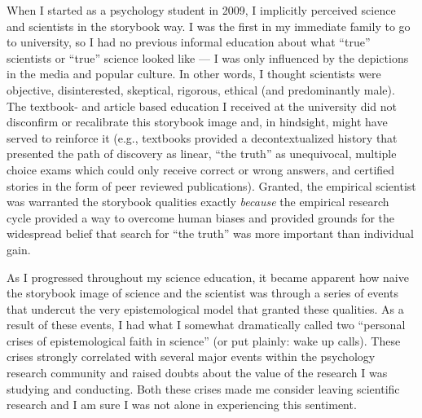 \documentclass[a5paper]{book}
\begin{document}
When I started as a psychology student in 2009, I implicitly perceived
science and scientists in the storybook way. I was the first in my
immediate family to go to university, so I had no previous informal
education about what \enquote{true} scientists or \enquote{true} science
looked like --- I was only influenced by the depictions in the media and
popular culture. In other words, I thought scientists were objective,
disinterested, skeptical, rigorous, ethical (and predominantly male).
The textbook- and article based education I received at the university
did not disconfirm or recalibrate this storybook image and, in
hindsight, might have served to reinforce it (e.g., textbooks provided a
decontextualized history that presented the path of discovery as linear,
\enquote{the truth} as unequivocal, multiple choice exams which could
only receive correct or wrong answers, and certified stories in the form
of peer reviewed publications). Granted, the empirical scientist was
warranted the storybook qualities exactly \emph{because} the empirical
research cycle provided a way to overcome human biases and provided
grounds for the widespread belief that search for \enquote{the truth}
was more important than individual gain.

As I progressed throughout my science education, it became apparent how
naive the storybook image of science and the scientist was through a
series of events that undercut the very epistemological model that
granted these qualities. As a result of these events, I had what I
somewhat dramatically called two \enquote{personal crises of
epistemological faith in science} (or put plainly: wake up calls). These
crises strongly correlated with several major events within the
psychology research community and raised doubts about the value of the
research I was studying and conducting. Both these crises made me
consider leaving scientific research and I am sure I was not alone in
experiencing this sentiment.
\end{document}

